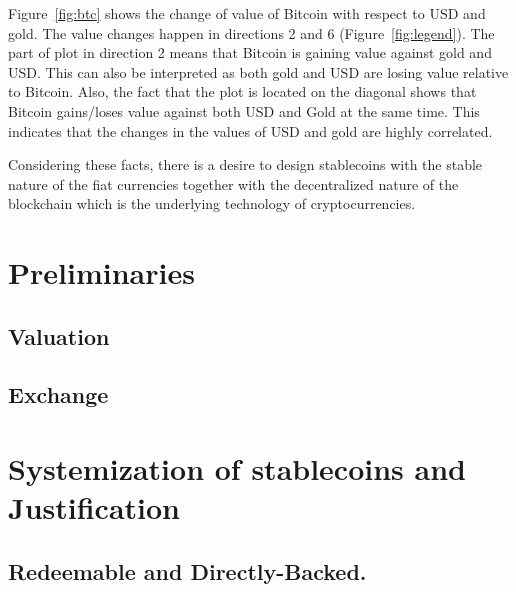 Figure~\ref{fig:btc} shows the change of value of Bitcoin with respect to USD and gold. The value changes happen in directions 2 and 6 (Figure~\ref{fig:legend}). The part of plot in direction 2 means that Bitcoin is gaining value against gold and USD. This can also be interpreted as both gold and USD are losing value relative to Bitcoin. %
Also, the fact that the plot is located on the diagonal shows that Bitcoin gains/loses value against both USD and Gold at the same time. This indicates that the changes in the values of USD and gold are highly correlated.

Considering these facts, there is a desire to design stablecoins with the stable nature of the fiat currencies together with the decentralized nature of the blockchain which is the underlying technology of cryptocurrencies.


\section{Preliminaries}

\subsection{Valuation}

\subsection{Exchange}



\section{Systemization of stablecoins and Justification}
 \par


 


\subsection{Redeemable and Directly-Backed.} 


